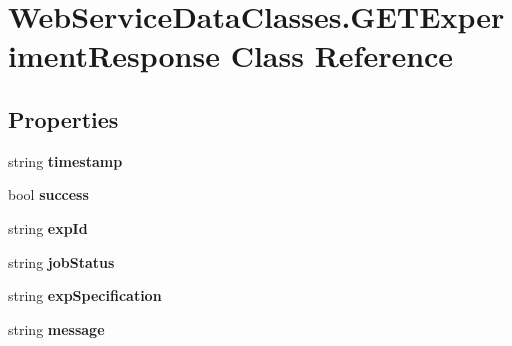 \hypertarget{class_web_service_data_classes_1_1_g_e_t_experiment_response}{}\section{Web\+Service\+Data\+Classes.\+G\+E\+T\+Experiment\+Response Class Reference}
\label{class_web_service_data_classes_1_1_g_e_t_experiment_response}
\subsection*{Properties}
\begin{DoxyCompactItemize}
\item 
\hypertarget{class_web_service_data_classes_1_1_g_e_t_experiment_response_a58ba12892ab87a0adde3b7dca196e2ea}{}string {\bfseries timestamp}\label{class_web_service_data_classes_1_1_g_e_t_experiment_response_a58ba12892ab87a0adde3b7dca196e2ea}

\item 
\hypertarget{class_web_service_data_classes_1_1_g_e_t_experiment_response_a6892a075a7e4385522583d556aa7794c}{}bool {\bfseries success}\label{class_web_service_data_classes_1_1_g_e_t_experiment_response_a6892a075a7e4385522583d556aa7794c}

\item 
\hypertarget{class_web_service_data_classes_1_1_g_e_t_experiment_response_a65c92ac5bfcd0a7fd395f49673df94c1}{}string {\bfseries exp\+Id}\label{class_web_service_data_classes_1_1_g_e_t_experiment_response_a65c92ac5bfcd0a7fd395f49673df94c1}

\item 
\hypertarget{class_web_service_data_classes_1_1_g_e_t_experiment_response_a1aed0da60cf7cb92439f231350310cd3}{}string {\bfseries job\+Status}\label{class_web_service_data_classes_1_1_g_e_t_experiment_response_a1aed0da60cf7cb92439f231350310cd3}

\item 
\hypertarget{class_web_service_data_classes_1_1_g_e_t_experiment_response_aab910e75df0bbc0a2f5ba8937ef91e7b}{}string {\bfseries exp\+Specification}\label{class_web_service_data_classes_1_1_g_e_t_experiment_response_aab910e75df0bbc0a2f5ba8937ef91e7b}

\item 
\hypertarget{class_web_service_data_classes_1_1_g_e_t_experiment_response_a507e974080cdbb7641c619ad8186bd21}{}string {\bfseries message}\label{class_web_service_data_classes_1_1_g_e_t_experiment_response_a507e974080cdbb7641c619ad8186bd21}

\end{DoxyCompactItemize}
